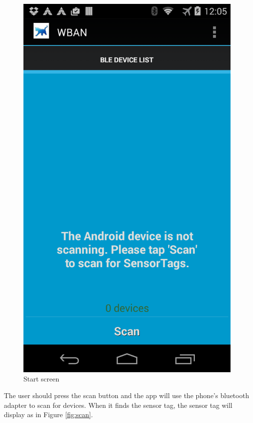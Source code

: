 \documentclass{article}
\begin{document}
\begin{figure}[!h]
\label{fig:start}
  \centering
  \includegraphics[width=\WID]{pics/start.png}
  \caption{Start screen}
\end{figure}

The user should press the scan button and the app will use the phone's bluetooth adapter to scan for devices. When
it finds the sensor tag, the sensor tag will display as in Figure \ref{fig:scan}.
\end{document}
